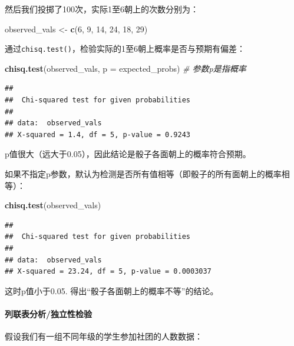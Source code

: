 \documentclass[]{book}
\newenvironment{Shaded}{\begin{snugshade}}{\end{snugshade}}
\newcommand{\CommentTok}[1]{\textcolor[rgb]{0.56,0.35,0.01}{\textit{#1}}}
\newcommand{\DataTypeTok}[1]{\textcolor[rgb]{0.13,0.29,0.53}{#1}}
\newcommand{\DecValTok}[1]{\textcolor[rgb]{0.00,0.00,0.81}{#1}}
\newcommand{\KeywordTok}[1]{\textcolor[rgb]{0.13,0.29,0.53}{\textbf{#1}}}
\newcommand{\NormalTok}[1]{#1}
\newcommand{\StringTok}[1]{\textcolor[rgb]{0.31,0.60,0.02}{#1}}
\let\oldparagraph\paragraph
\renewcommand{\paragraph}[1]{\oldparagraph{#1}\mbox{}}
\begin{document}
然后我们投掷了100次，实际1至6朝上的次数分别为：

\begin{Shaded}
\begin{Highlighting}[]
\NormalTok{observed_vals <-}\StringTok{ }\KeywordTok{c}\NormalTok{(}\DecValTok{6}\NormalTok{, }\DecValTok{9}\NormalTok{, }\DecValTok{14}\NormalTok{, }\DecValTok{24}\NormalTok{, }\DecValTok{18}\NormalTok{, }\DecValTok{29}\NormalTok{)}
\end{Highlighting}
\end{Shaded}

通过\texttt{chisq.test()}，检验实际的1至6朝上概率是否与预期有偏差：

\begin{Shaded}
\begin{Highlighting}[]
\KeywordTok{chisq.test}\NormalTok{(observed_vals, }\DataTypeTok{p =}\NormalTok{ expected_probs) }\CommentTok{# 参数p是指概率}
\end{Highlighting}
\end{Shaded}

\begin{verbatim}
## 
##  Chi-squared test for given probabilities
## 
## data:  observed_vals
## X-squared = 1.4, df = 5, p-value = 0.9243
\end{verbatim}

p值很大（远大于0.05），因此结论是骰子各面朝上的概率符合预期。

如果不指定p参数，默认为检测是否所有值相等（即骰子的所有面朝上的概率相等）：

\begin{Shaded}
\begin{Highlighting}[]
\KeywordTok{chisq.test}\NormalTok{(observed_vals)}
\end{Highlighting}
\end{Shaded}

\begin{verbatim}
## 
##  Chi-squared test for given probabilities
## 
## data:  observed_vals
## X-squared = 23.24, df = 5, p-value = 0.0003037
\end{verbatim}

这时p值小于0.05. 得出``骰子各面朝上的概率不等''的结论。

\paragraph{列联表分析/独立性检验}

假设我们有一组不同年级的学生参加社团的人数数据：
\end{document}
